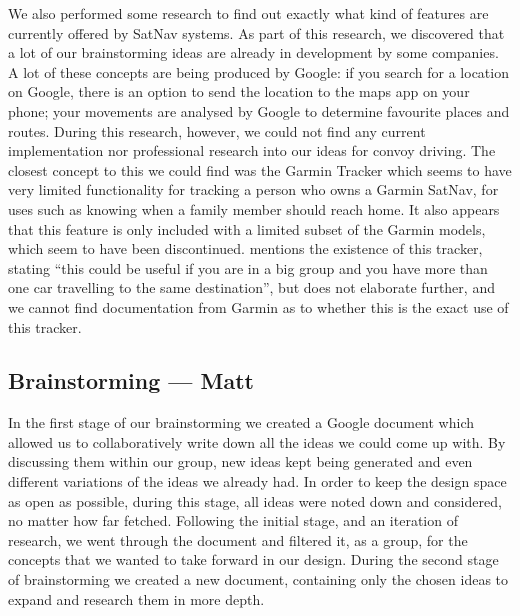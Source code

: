 \documentclass{article}
\begin{document}
We also performed some research to find out exactly what kind of features are currently offered by SatNav systems. As part of this research, we discovered that a lot of our brainstorming ideas are already in development by some companies. A lot of these concepts are being produced by Google: if you search for a location on Google, there is an option to send the location to the maps app on your phone; your movements are analysed by Google to determine favourite places and routes.
During this research, however, we could not find any current implementation nor professional research into our ideas for convoy driving. The closest concept to this we could find was the Garmin Tracker
which seems to have very limited functionality for tracking a person who owns a Garmin SatNav, for uses such as knowing when a family member should reach home. It also appears that this feature is only included with a limited subset of the Garmin models, which seem to have been discontinued. \cite{RefWorks:2} 
mentions the existence of this tracker, stating ``this could be useful if you are in a big group and you have more than one car travelling to the same destination'', but does not elaborate further, and we cannot find documentation from Garmin as to whether this is the exact use of this tracker.

\subsection{Brainstorming --- Matt}\label{ssec:nav-brainstorming}
In the first stage of our brainstorming we created a Google document which allowed us to collaboratively write down all the ideas we could come up with. By discussing them within our group, new ideas kept being generated and even different variations of the ideas we already had. In order to keep the design space as open as possible, during this stage, all ideas were noted down and considered, no matter how far fetched. Following the initial stage, and an iteration of research, we went through the document and filtered it, as a group, for the concepts that we wanted to take forward in our design. During the second stage of brainstorming we created a new document, containing only the chosen ideas to expand and research them in more depth.
\end{document}
